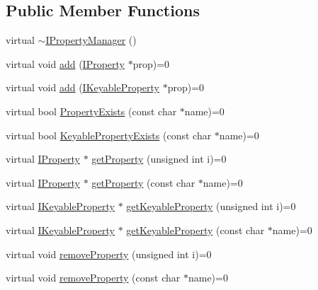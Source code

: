 \subsection*{Public Member Functions}
\begin{DoxyCompactItemize}
\item 
virtual \hyperlink{classmaudio_1_1IPropertyManager_a6d20a85da5ef123b1ccd72360c5d24e4}{$\sim$\-I\-Property\-Manager} ()
\item 
virtual void \hyperlink{classmaudio_1_1IPropertyManager_a6f1c1a5a3e9714e8ab22b73a5f67807e}{add} (\hyperlink{classmaudio_1_1IProperty}{I\-Property} $\ast$prop)=0
\item 
virtual void \hyperlink{classmaudio_1_1IPropertyManager_a719bb2f8d8fb55126c7dc6d264600768}{add} (\hyperlink{classmaudio_1_1IKeyableProperty}{I\-Keyable\-Property} $\ast$prop)=0
\item 
virtual bool \hyperlink{classmaudio_1_1IPropertyManager_a0d2b0d87656c2eb7e93ca867848d1559}{Property\-Exists} (const char $\ast$name)=0
\item 
virtual bool \hyperlink{classmaudio_1_1IPropertyManager_a95f90f98cff9992a48fabe61168c95fb}{Keyable\-Property\-Exists} (const char $\ast$name)=0
\item 
virtual \hyperlink{classmaudio_1_1IProperty}{I\-Property} $\ast$ \hyperlink{classmaudio_1_1IPropertyManager_af25154a1f612b2bc44e40304290615ef}{get\-Property} (unsigned int i)=0
\item 
virtual \hyperlink{classmaudio_1_1IProperty}{I\-Property} $\ast$ \hyperlink{classmaudio_1_1IPropertyManager_acbaea1cbdc990b9b4b0416a5c35d9435}{get\-Property} (const char $\ast$name)=0
\item 
virtual \hyperlink{classmaudio_1_1IKeyableProperty}{I\-Keyable\-Property} $\ast$ \hyperlink{classmaudio_1_1IPropertyManager_a68747539c9a666215de88337998b45d7}{get\-Keyable\-Property} (unsigned int i)=0
\item 
virtual \hyperlink{classmaudio_1_1IKeyableProperty}{I\-Keyable\-Property} $\ast$ \hyperlink{classmaudio_1_1IPropertyManager_ac53ff45a9a42e265fa0d044a09bcc2ae}{get\-Keyable\-Property} (const char $\ast$name)=0
\item 
virtual void \hyperlink{classmaudio_1_1IPropertyManager_aedc3df4a29c0ae8d137ac29b5b0abbf1}{remove\-Property} (unsigned int i)=0
\item 
virtual void \hyperlink{classmaudio_1_1IPropertyManager_a41d9333efef184d05a1e1c929097059f}{remove\-Property} (const char $\ast$name)=0
\item 

\end{DoxyCompactItemize}
